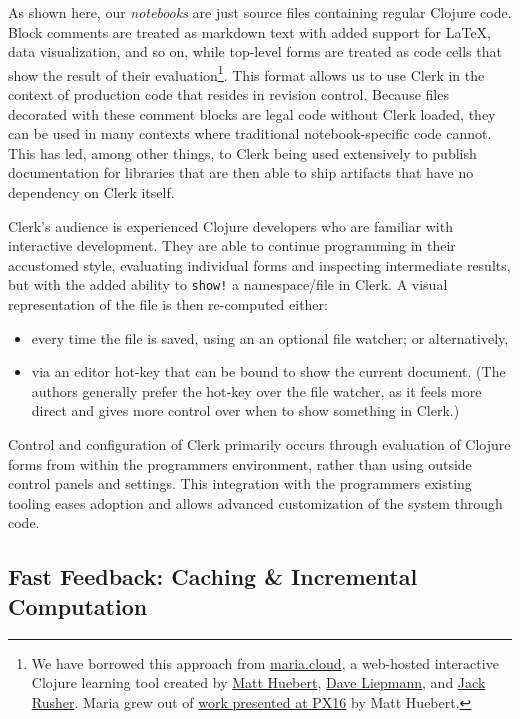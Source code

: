 \documentclass[sigconf,screen]{acmart}
\newcommand{\passthrough}[1]{#1}
\providecommand{\tightlist}{%
  \setlength{\itemsep}{0pt}\setlength{\parskip}{0pt}}
\begin{document}
As shown here, our \emph{notebooks} are just source files containing regular Clojure code. Block comments are treated as markdown text with added support for LaTeX, data visualization, and so on, while top-level forms are treated as code cells that show the result of their evaluation\footnote{We have borrowed this approach from \href{https://maria.cloud}{maria.cloud}, a web-hosted interactive Clojure learning tool created by \href{https://matt.is}{Matt Huebert}, \href{https://www.daveliepmann.com/}{Dave Liepmann}, and \href{https://jackrusher.com/}{Jack Rusher}. Maria grew out of \href{https://px16.matt.is}{work presented at PX16} by Matt Huebert.}. This format allows us to use Clerk in the context of production code that resides in revision control. Because files decorated with these comment blocks are legal code without Clerk loaded, they can be used in many contexts where traditional notebook-specific code cannot. This has led, among other things, to Clerk being used extensively to publish documentation for libraries that are then able to ship artifacts that have no dependency on Clerk itself.

Clerk's audience is experienced Clojure developers who are familiar with interactive development. They are able to continue programming in their accustomed style, evaluating individual forms and inspecting intermediate results, but with the added ability to \passthrough{\lstinline"show!"} a namespace/file in Clerk. A visual representation of the file is then re-computed either:

\begin{itemize}
\tightlist
\item
  every time the file is saved, using an an optional file watcher; or alternatively,
\item
  via an editor hot-key that can be bound to show the current document. (The authors generally prefer the hot-key over the file watcher, as it feels more direct and gives more control over when to show something in Clerk.)
\end{itemize}

Control and configuration of Clerk primarily occurs through evaluation of Clojure forms from within the programmer\textquotesingle s environment, rather than using outside control panels and settings. This integration with the programmer\textquotesingle s existing tooling eases adoption and allows advanced customization of the system through code.

\hypertarget{fast-feedback:-caching-ux5cux26-incremental-computation}{%
\subsection{Fast Feedback: Caching \& Incremental Computation}\label{fast-feedback:-caching-ux5cux26-incremental-computation}}
\end{document}
